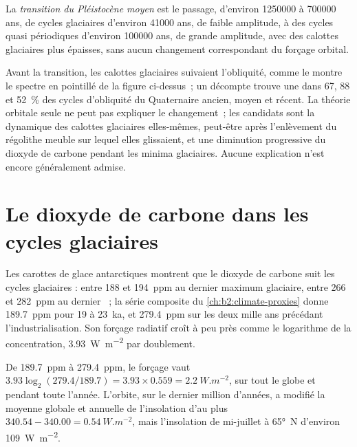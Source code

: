 \begin{definition}\label{def:b2:orbital-forcing:mpt}
La \emph{transition du Pléistocène moyen} est le passage, d'environ \num{1250000} à \num{700000} ans,
de cycles glaciaires d'environ \num{41000} ans, de faible amplitude, à des cycles quasi périodiques d'environ \num{100000} ans,
de grande amplitude, avec des calottes glaciaires plus épaisses, sans aucun changement correspondant
du forçage orbital.
\end{definition}

Avant la transition, les calottes glaciaires suivaient l'obliquité, comme le montre le spectre en pointillé de la figure
ci-dessus~; un décompte trouve une  dans 67, 88 et \qty{52}{\percent} des cycles d'obliquité
du Quaternaire ancien, moyen et récent. La théorie orbitale seule ne peut pas expliquer le changement~; les candidats sont
la dynamique des calottes glaciaires elles-mêmes, peut-être après l'enlèvement du régolithe meuble sur lequel elles glissaient,
et une diminution progressive du dioxyde de carbone pendant les minima glaciaires. Aucune explication n'est encore
généralement admise.

\section{Le dioxyde de carbone dans les cycles glaciaires}\label{sec:b2:orbital-forcing:co2}

Les carottes de glace antarctiques montrent que le dioxyde de carbone suit les cycles glaciaires : entre 188 et
\qty{194}{ppm} au dernier maximum glaciaire, entre 266 et \qty{282}{ppm} au dernier ~;
la série composite du \cref{ch:b2:climate-proxies} donne \qty{189.7}{ppm} pour 19 à
\qty{23}{ka}, et \qty{279.4}{ppm} sur les deux mille ans précédant l'industrialisation. Son forçage radiatif
croît à peu près comme le logarithme de la concentration, \qty{3.93}{W.m^{-2}} par doublement.

\begin{example}\label{ex:b2:orbital-forcing:co2}
De \qty{189.7}{ppm} à \qty{279.4}{ppm}, le forçage vaut $3.93\log_2(279.4/189.7) = 3.93 \times
0.559 = \qty{2.2}{W.m^{-2}}$, sur tout le globe et pendant toute l'année. L'orbite, sur le dernier million d'années, a modifié
la moyenne globale et annuelle de l'insolation d'au plus $340.54 - 340.00 =
\qty{0.54}{W.m^{-2}}$, mais l'insolation de mi-juillet à \ang{65}~N d'environ \qty{109}{W.m^{-2}}.
\end{example}

